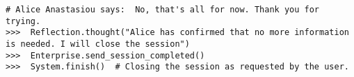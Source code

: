 \begin{lstlisting}
# Alice Anastasiou says:  No, that's all for now. Thank you for trying. 
>>>  Reflection.thought("Alice has confirmed that no more information is needed. I will close the session")
>>>  Enterprise.send_session_completed()
>>>  System.finish()  # Closing the session as requested by the user.
\end{lstlisting}







